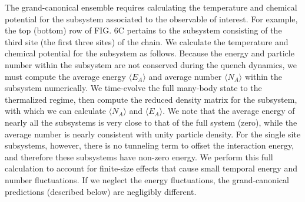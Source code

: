 The grand-canonical ensemble requires calculating the temperature and chemical potential for the subsystem associated to the observable of interest. For example, the top (bottom) row of FIG. 6C pertains to the subsystem consisting of the third site (the first three sites) of the chain. We calculate the temperature and chemical potential for the subsystem as follows. Because the energy and particle number within the subsystem are not conserved during the quench dynamics, we must compute the average energy $\langle E_A \rangle$ and average number $\langle N_A \rangle$ within the subsystem numerically. We time-evolve the full many-body state to the thermalized regime, then compute the reduced density matrix for the subsystem, with which we can calculate $\langle N_A \rangle$  and $\langle E_A \rangle$. %
We note that the average energy of nearly all the subsystems is very close to that of the full system (zero), while the average number is nearly consistent with unity particle density. For the single site subsystems, however, there is no tunneling term to offset the interaction energy, and therefore these subsystems have non-zero energy. We perform this full calculation to account for finite-size effects that cause small temporal energy and number fluctuations. If we neglect the energy fluctuations, the grand-canonical predictions (described below) are negligibly different. 

